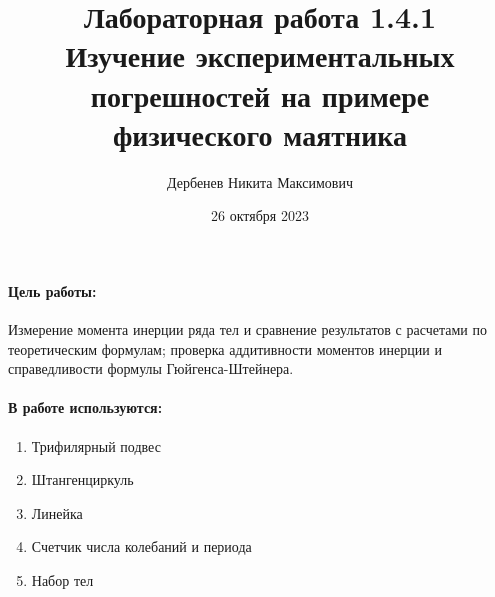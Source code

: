 \documentclass[a4paper, 10pt]{article}%
\author{Дербенев Никита Максимович}
\title{Лабораторная работа 1.4.1\\
	Изучение экспериментальных погрешностей на примере физического маятника}
\date{26 октября 2023}
\begin{document}
	\maketitle
	\paragraph {Цель работы:}
	Измерение момента инерции ряда тел и сравнение результатов с расчетами по теоретическим формулам; проверка аддитивности моментов инерции и справедливости формулы Гюйгенса-Штейнера.
	\paragraph{В работе используются:}
	\begin{enumerate}
		\item Трифилярный подвес
		\item Штангенциркуль
		\item Линейка
		\item Счетчик числа колебаний и периода
		\item Набор тел
	\end{enumerate}
\end{document}
